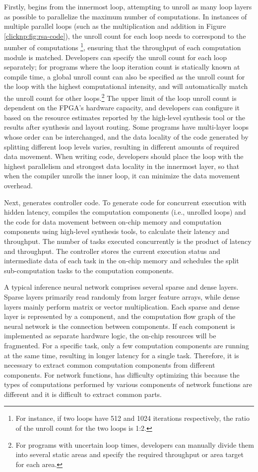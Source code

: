 Firstly, \name begins from the innermost loop, attempting to unroll as many loop layers as possible to parallelize the maximum number of computations. In instances of multiple parallel loops (such as the multiplication and addition in Figure \ref{clicknp:fig:rsa-code}), the unroll count for each loop needs to correspond to the number of computations \footnote{For instance, if two loops have 512 and 1024 iterations respectively, the ratio of the unroll count for the two loops is 1:2.}, ensuring that the throughput of each computation module is matched. Developers can specify the unroll count for each loop separately; for programs where the loop iteration count is statically known at compile time, a global unroll count can also be specified as the unroll count for the loop with the highest computational intensity, and \name will automatically match the unroll count for other loops.\footnote{For programs with uncertain loop times, developers can manually divide them into several static areas and specify the required throughput or area target for each area.} The upper limit of the loop unroll count is dependent on the FPGA's hardware capacity, and developers can configure it based on the resource estimates reported by the high-level synthesis tool or the results after synthesis and layout routing. Some programs have multi-layer loops whose order can be interchanged, and the data locality of the code generated by splitting different loop levels varies, resulting in different amounts of required data movement. When writing \name code, developers should place the loop with the highest parallelism and strongest data locality in the innermost layer, so that when the compiler unrolls the inner loop, it can minimize the data movement overhead.

Next, \name generates controller code. To generate code for concurrent execution with hidden latency, \name compiles the computation components (i.e., unrolled loops) and the code for data movement between on-chip memory and computation components using high-level synthesis tools, to calculate their latency and throughput. The number of tasks executed concurrently is the product of latency and throughput. The controller stores the current execution status and intermediate data of each task in the on-chip memory and schedules the split sub-computation tasks to the computation components.

A typical inference neural network comprises several sparse and dense layers. Sparse layers primarily read randomly from larger feature arrays, while dense layers mainly perform matrix or vector multiplication. Each sparse and dense layer is represented by a \name component, and the computation flow graph of the neural network is the connection between \name components. If each component is implemented as separate hardware logic, the on-chip resources will be fragmented. For a specific task, only a few computation components are running at the same time, resulting in longer latency for a single task. Therefore, it is necessary to extract common computation components from different components. For network functions, \name has difficulty optimizing this because the types of computations performed by various components of network functions are different and it is difficult to extract common parts.

